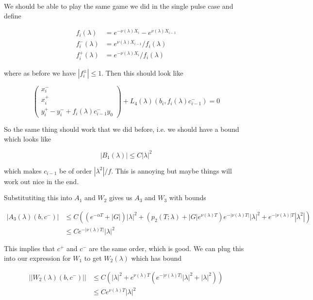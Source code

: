 \documentclass[12pt]{article}
\begin{document}
\begin{enumerate}
We should be able to play the same game we did in the single pulse case and define

\begin{align*}
f_i(\lambda) &= e^{-\nu(\lambda)X_i} - e^{\nu(\lambda)X_{i-1}}  \\
f_i^-(\lambda) &= e^{\nu(\lambda)X_{i-1}} / f_i(\lambda) \\
f_i^+(\lambda) &= e^{-\nu(\lambda)X_{i}} / f_i(\lambda)
\end{align*}

where as before we have $|f_i^\pm| \leq 1$. Then this should look like

\[
\begin{pmatrix}x_i^- \\ x_i^+ \\ y_i^+ - y_i^- + f_i(\lambda) c_{i-1}^- y_0 \end{pmatrix} + L_4(\lambda)(b_i, f_i(\lambda) c_{i-1}^-) = 0
\]

So the same thing should work that we did before, i.e. we should have a bound which looks like 

\[
|B_1(\lambda)| \leq C|\lambda|^2
\]

which makes $c_{i-1}$ be of order $|\lambda^2| / f$. This is annoying but maybe things will work out nice in the end. 


Substitutiting this into $A_1$ and $W_2$ gives us $A_3$ and $W_3$ with bounds

\begin{align*}
|A_3(\lambda)(b, c^-)| &\leq C ( (e^{-\alpha T} + |G|)|\lambda|^2 + ( p_2(T; \lambda) + |G|e^{\nu(\lambda)T})e^{-|\nu(\lambda)T|} |\lambda|^2 + e^{-|\nu(\lambda)|T} |\lambda^2|) \\
&\leq C e^{-|\nu(\lambda)T|} |\lambda|^2
\end{align*}

This implies that $c^+$ and $c^-$ are the same order, which is good. We can plug this into our expression for $W_1$ to get $W_2(\lambda)$ which has bound

\begin{align*}
||W_2(\lambda)(b,c^-)|| &\leq C (|\lambda|^2 + e^{\nu(\lambda)T}(e^{-|\nu(\lambda)T|} |\lambda|^2 + |\lambda|^2)) \\
&\leq C e^{\nu(\lambda)T} |\lambda|^2
\end{align*}





\end{enumerate}
\end{document}
